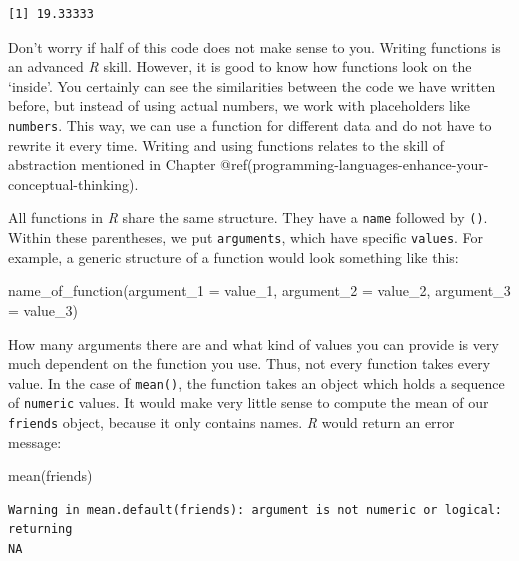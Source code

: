 \documentclass[
  letterpaper,
]{krantz}
\makeatletter
\newenvironment{Shaded}{\begin{snugshade}}{\end{snugshade}}
\newcommand{\AttributeTok}[1]{\textcolor[rgb]{0.40,0.45,0.13}{#1}}
\newcommand{\FunctionTok}[1]{\textcolor[rgb]{0.28,0.35,0.67}{#1}}
\newcommand{\NormalTok}[1]{\textcolor[rgb]{0.00,0.23,0.31}{#1}}
\newenvironment{kframe}{%
\medskip{}
\setlength{\fboxsep}{.8em}
 \def\at@end@of@kframe{}%
 \ifinner\ifhmode%
  \def\at@end@of@kframe{\end{minipage}}%
  \begin{minipage}{\columnwidth}%
 \fi\fi%
 \def\FrameCommand##1{\hskip\@totalleftmargin \hskip-\fboxsep
 \colorbox{shadecolor}{##1}\hskip-\fboxsep
     \hskip-\linewidth \hskip-\@totalleftmargin \hskip\columnwidth}%
 \MakeFramed {\advance\hsize-\width
   \@totalleftmargin\z@ \linewidth\hsize
   \@setminipage}}%
 {\par\unskip\endMakeFramed%
 \at@end@of@kframe}
\renewenvironment{Shaded}{\begin{kframe}}{\end{kframe}}
\makeatother
\begin{document}
\begin{verbatim}
[1] 19.33333
\end{verbatim}

Don't worry if half of this code does not make sense to you. Writing
functions is an advanced \emph{R} skill. However, it is good to know how
functions look on the `inside'. You certainly can see the similarities
between the code we have written before, but instead of using actual
numbers, we work with placeholders like \texttt{numbers}. This way, we
can use a function for different data and do not have to rewrite it
every time. Writing and using functions relates to the skill of
abstraction mentioned in Chapter
@ref(programming-languages-enhance-your-conceptual-thinking).

All functions in \emph{R} share the same structure. They have a
\texttt{name} followed by \texttt{()}. Within these parentheses, we put
\texttt{arguments}, which have specific \texttt{values}. For example, a
generic structure of a function would look something like this:

\begin{Shaded}
\begin{Highlighting}[]
\FunctionTok{name\_of\_function}\NormalTok{(}\AttributeTok{argument\_1 =}\NormalTok{ value\_1,}
                 \AttributeTok{argument\_2 =}\NormalTok{ value\_2,}
                 \AttributeTok{argument\_3 =}\NormalTok{ value\_3)}
\end{Highlighting}
\end{Shaded}

How many arguments there are and what kind of values you can provide is
very much dependent on the function you use. Thus, not every function
takes every value. In the case of \texttt{mean()}, the function takes an
object which holds a sequence of \texttt{numeric} values. It would make
very little sense to compute the mean of our \texttt{friends} object,
because it only contains names. \emph{R} would return an error message:

\begin{Shaded}
\begin{Highlighting}[]
\FunctionTok{mean}\NormalTok{(friends)}
\end{Highlighting}
\end{Shaded}

\begin{verbatim}
Warning in mean.default(friends): argument is not numeric or logical: returning
NA
\end{verbatim}
\end{document}

